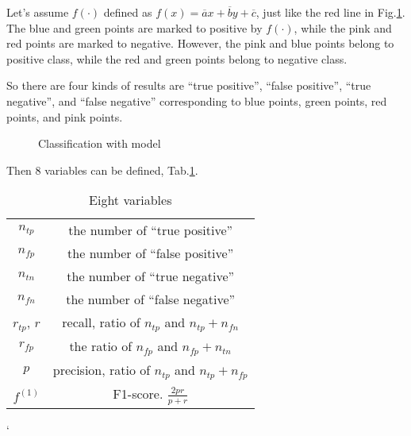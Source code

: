 Let's assume $f(\cdot)$ defined as $f(x) = \overline{a}x+\overline{b}y+\overline{c}$,
just like the red line in Fig.\ref{fig:classification-2}.
The blue and green points are marked to positive by $f(\cdot)$, while the pink and red points are
marked to negative. However, the pink and blue points belong to positive class, while
the red and green points belong to negative class.

So there are four kinds of results are ``true positive'', ``false positive'', ``true negative'',
and ``false negative'' corresponding to {\color{blue}blue points}, {\color{green}green points},
{\color{red}red points}, and {\color{pink}pink points}.



\begin{figure}
    \centering
    \caption{Classification with model}
    \label{fig:classification-2}
\end{figure}

Then 8 variables can be defined, Tab.\ref{tab:8v}.

\begin{table}
    \centering
\begin{tabular}{cc}
    \hline
    $n_{tp}$ & the number of ``true positive'' \\ 
    $n_{fp}$ & the number of ``false positive'' \\ 
    $n_{tn}$ & the number of ``true negative'' \\ 
    $n_{fn}$ & the number of ``false negative'' \\ 
    $r_{tp}$, $r$ & recall, ratio of $n_{tp}$ and $n_{tp} + n_{fn}$ \\ 
    $r_{fp}$ & the ratio of $n_{fp}$ and $n_{fp} + n_{tn}$ \\ 
    $p$ &  precision, ratio of $n_{tp}$ and $n_{tp} + n_{fp}$ \\ 
    $f^{(1)}$ & F1-score. $\frac{2pr}{p+r}$ \\ 
    \hline 
\end{tabular}
`   \caption{Eight variables}
\label{tab:8v}
\end{table}

